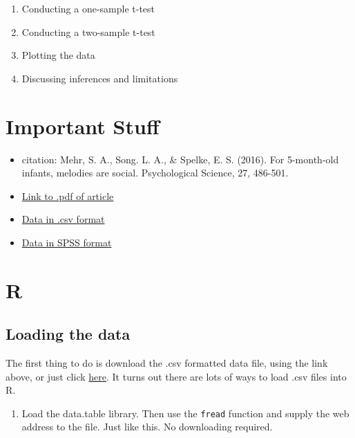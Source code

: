 \documentclass[]{book}
\providecommand{\tightlist}{%
  \setlength{\itemsep}{0pt}\setlength{\parskip}{0pt}}
\theoremstyle{definition}
\theoremstyle{definition}
\theoremstyle{definition}
\theoremstyle{remark}
\begin{document}
\begin{enumerate}
\def\labelenumi{\arabic{enumi}.}
\tightlist
\item
  Conducting a one-sample t-test
\item
  Conducting a two-sample t-test
\item
  Plotting the data
\item
  Discussing inferences and limitations
\end{enumerate}

\section{Important Stuff}\label{important-stuff}

\begin{itemize}
\tightlist
\item
  citation: Mehr, S. A., Song. L. A., \& Spelke, E. S. (2016). For
  5-month-old infants, melodies are social. Psychological Science, 27,
  486-501.
\item
  \href{http://journals.sagepub.com/stoken/default+domain/d5HcBHg85XamSXGdYqYN/full}{Link
  to .pdf of article}
\item
  \href{https://raw.githubusercontent.com/CrumpLab/statisticsLab/master/data/MehrSongSpelke2016.csv}{Data
  in .csv format}
\item
  \href{https://drive.google.com/open?id=0Bz-rhZ21ShvOa3c4X3hqOWxwcUU}{Data
  in SPSS format}
\end{itemize}

\section{R}\label{r-6}

\subsection{Loading the data}\label{loading-the-data}

The first thing to do is download the .csv formatted data file, using
the link above, or just click
\href{https://drive.google.com/open?id=0Bz-rhZ21ShvOdW1wV0pmUTJSSk0}{here}.
It turns out there are lots of ways to load .csv files into R.

\begin{enumerate}
\def\labelenumi{\arabic{enumi}.}
\tightlist
\item
  Load the data.table library. Then use the \texttt{fread} function and
  supply the web address to the file. Just like this. No downloading
  required.
\end{enumerate}
\end{document}
